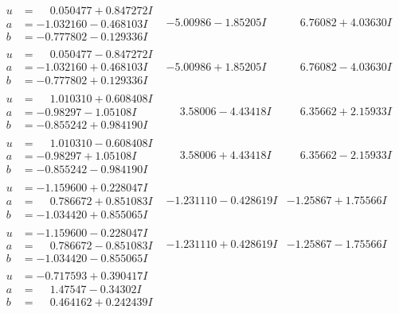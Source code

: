 \documentclass[1p]{elsarticle_modified}
\theoremstyle{definition}
\begin{document}
$$\begin{array}{c|c|c}
\begin{aligned}
u &= \phantom{-}0.050477 + 0.847272 I \\
a &= -1.032160 - 0.468103 I \\
b &= -0.777802 - 0.129336 I\end{aligned}
 & -5.00986 - 1.85205 I & \phantom{-}6.76082 + 4.03630 I \\ \hline\begin{aligned}
u &= \phantom{-}0.050477 - 0.847272 I \\
a &= -1.032160 + 0.468103 I \\
b &= -0.777802 + 0.129336 I\end{aligned}
 & -5.00986 + 1.85205 I & \phantom{-}6.76082 - 4.03630 I \\ \hline\begin{aligned}
u &= \phantom{-}1.010310 + 0.608408 I \\
a &= -0.98297 - 1.05108 I \\
b &= -0.855242 + 0.984190 I\end{aligned}
 & \phantom{-}3.58006 - 4.43418 I & \phantom{-}6.35662 + 2.15933 I \\ \hline\begin{aligned}
u &= \phantom{-}1.010310 - 0.608408 I \\
a &= -0.98297 + 1.05108 I \\
b &= -0.855242 - 0.984190 I\end{aligned}
 & \phantom{-}3.58006 + 4.43418 I & \phantom{-}6.35662 - 2.15933 I \\ \hline\begin{aligned}
u &= -1.159600 + 0.228047 I \\
a &= \phantom{-}0.786672 + 0.851083 I \\
b &= -1.034420 + 0.855065 I\end{aligned}
 & -1.231110 - 0.428619 I & -1.25867 + 1.75566 I \\ \hline\begin{aligned}
u &= -1.159600 - 0.228047 I \\
a &= \phantom{-}0.786672 - 0.851083 I \\
b &= -1.034420 - 0.855065 I\end{aligned}
 & -1.231110 + 0.428619 I & -1.25867 - 1.75566 I \\ \hline\begin{aligned}
u &= -0.717593 + 0.390417 I \\
a &= \phantom{-}1.47547 - 0.34302 I \\
b &= \phantom{-}0.464162 + 0.242439 I\end{aligned}

\end{array}$$
\end{document}
